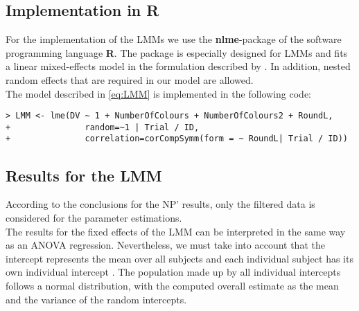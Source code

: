 \subsection{Implementation in R}

For the implementation of the \ac{LMM}s we use the \textbf{nlme}-package of the software programming language \textbf{R}. The package is especially designed for \ac{LMM}s  \citep{Pinheiro2013} and fits a linear mixed-effects model in the formulation described by \cite{Laird1982}. In addition, nested random effects that are required in our model are allowed.\\
The model described in \ref{eq:LMM} is implemented in the following code:
\begin{verbatim}
> LMM <- lme(DV ~ 1 + NumberOfColours + NumberOfColours2 + RoundL, 
+               random=~1 | Trial / ID, 
+               correlation=corCompSymm(form = ~ RoundL| Trial / ID))
\end{verbatim}

\subsection{Results for the \ac{LMM}}

According to the conclusions for the \acl{NP}' results, only the filtered data is considered for the parameter estimations.\\
The results for the fixed effects of the \ac{LMM} can be interpreted in the same way as an ANOVA regression. Nevertheless, we must take into account that the intercept represents the mean over all subjects and each individual subject has its own individual intercept \citep{Seltman2012}. The population made up by all individual intercepts follows a normal distribution, with the computed overall estimate as the mean and the variance of the random intercepts.

